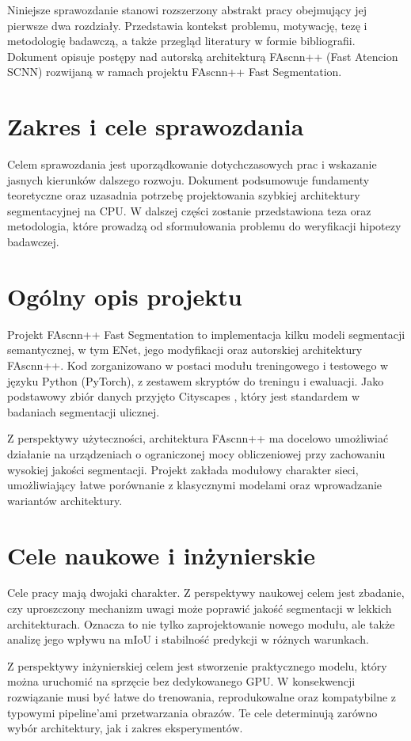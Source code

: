 \documentclass[12pt,oneside,a4paper]{report}
\begin{document}
Niniejsze sprawozdanie stanowi rozszerzony abstrakt pracy obejmujący jej pierwsze
dwa rozdziały. Przedstawia kontekst problemu, motywację, tezę i metodologię
badawczą, a także przegląd literatury w formie bibliografii. Dokument opisuje
postępy nad autorską architekturą FAscnn++ (Fast Atencion SCNN) rozwijaną w
ramach projektu FAscnn++ Fast Segmentation.

\section{Zakres i cele sprawozdania}
Celem sprawozdania jest uporządkowanie dotychczasowych prac i wskazanie jasnych
kierunków dalszego rozwoju. Dokument podsumowuje fundamenty teoretyczne oraz
uzasadnia potrzebę projektowania szybkiej architektury segmentacyjnej na CPU.
W dalszej części zostanie przedstawiona teza oraz metodologia, które prowadzą
od sformułowania problemu do weryfikacji hipotezy badawczej.

\section{Ogólny opis projektu}
Projekt FAscnn++ Fast Segmentation to implementacja kilku modeli segmentacji
semantycznej, w tym ENet, jego modyfikacji oraz autorskiej architektury FAscnn++.
Kod zorganizowano w postaci modułu treningowego i testowego w języku Python
(PyTorch), z zestawem skryptów do treningu i ewaluacji. Jako podstawowy zbiór
danych przyjęto Cityscapes \parencite{cordts2016cityscapes}, który jest
standardem w badaniach segmentacji ulicznej.

Z perspektywy użyteczności, architektura FAscnn++ ma docelowo umożliwiać działanie na
urządzeniach o ograniczonej mocy obliczeniowej przy zachowaniu wysokiej jakości
segmentacji. Projekt zakłada modułowy charakter sieci, umożliwiający łatwe
porównanie z klasycznymi modelami oraz wprowadzanie wariantów architektury.

\section{Cele naukowe i inżynierskie}
Cele pracy mają dwojaki charakter. Z perspektywy naukowej celem jest zbadanie,
czy uproszczony mechanizm uwagi może poprawić jakość segmentacji w lekkich
architekturach. Oznacza to nie tylko zaprojektowanie nowego modułu, ale także
analizę jego wpływu na mIoU i stabilność predykcji w różnych warunkach.

Z perspektywy inżynierskiej celem jest stworzenie praktycznego modelu, który
można uruchomić na sprzęcie bez dedykowanego GPU. W konsekwencji rozwiązanie
musi być łatwe do trenowania, reprodukowalne oraz kompatybilne z typowymi
pipeline'ami przetwarzania obrazów. Te cele determinują zarówno wybór architektury,
jak i zakres eksperymentów.
\end{document}
